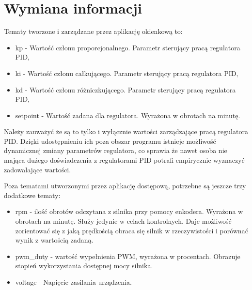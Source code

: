  
    \section{Wymiana informacji}
    

    Tematy tworzone i zarządzane przez aplikację okienkową to:

    \begin{itemize}
      \item kp - Wartość członu proporcjonalnego. Parametr sterujący pracą regulatora PID,
      \item ki - Wartość członu całkującego. Parametr sterujący pracą regulatora PID,
      \item kd - Wartość członu różniczkującego. Parametr sterujący pracą regulatora PID, 
      \item setpoint - Wartość zadana dla regulatora. Wyrażona w obrotach na minutę. 
    \end{itemize}

    Należy zauważyć że są to tylko i wyłącznie wartości zarządzające pracą regulatora PID. Dzięki udostępnieniu ich poza obszar programu istnieje możliwość dynamicznej zmiany parametrów regulatora, co sprawia że nawet osoba nie mająca dużego doświadczenia z regulatorami PID potrafi empirycznie wyznaczyć zadowalające wartości. 
    
    \vspace{1em} 
    Poza tematami utworzonymi przez aplikację dostępową, potrzebne są jeszcze trzy dodatkowe tematy:

    \begin{itemize}
      \item rpm - ilość obrotów odczytana z silnika przy pomocy enkodera. Wyrażona w obrotach na minutę. Służy jedynie w celach kontrolnych. Daje możliwość zorientować się z jaką prędkością obraca się silnik w rzeczywistości i porównać wynik z wartością zadaną.
      
      \item pwm\_duty - wartość wypełnienia PWM, wyrażona w procentach. Obrazuje stopień wykorzystania dostępnej mocy silnika.
      
      \item voltage - Napięcie zasilania urządzenia. 
      
    \end{itemize}
    
